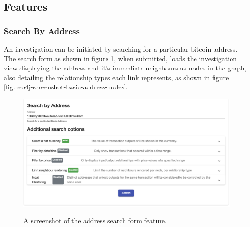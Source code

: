 \subsection{Features}
\subsubsection{Search By Address}
An investigation can be initiated by searching for a particular bitcoin address. The search form as shown in figure \ref{fig:neo4j-screenshot-search-form}, when submitted, loads the investigation view displaying the address and it's immediate neighbours as nodes in the graph, also detailing the relationship types each link represents, as shown in figure \ref{fig:neo4j-screenshot-basic-address-nodes}. 

\begin{figure}[h!]
  \centering
  \includegraphics[width = 15cm]{./figures/ui-screenshots/search-address-form}\\[0.5cm]
  \caption{A screenshot of the address search form feature.}
  \label{fig:neo4j-screenshot-search-form}
\end{figure}

